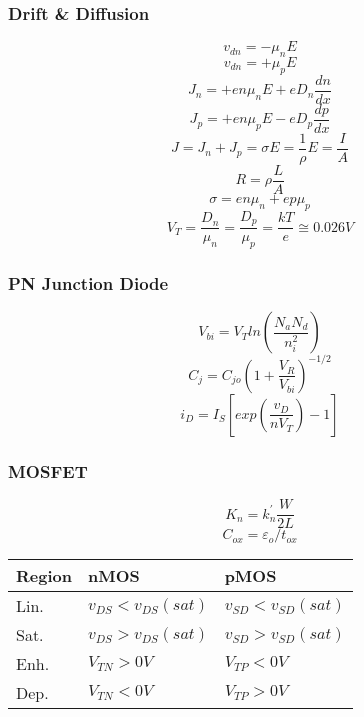 \documentclass[landscape, 12pt]{report}
\begin{document}
\begin{multicols*}{3}
\subsubsection*{Drift \& Diffusion}
\begin{equation}
    v_{dn} = -\mu_nE
\end{equation}
\begin{equation}
    v_{dn} = +\mu_pE
\end{equation}
\begin{equation}
    J_n = +en\mu_nE + eD_n\frac{dn}{dx}
\end{equation}
\begin{equation}
    J_p = +en\mu_pE -eD_p\frac{dp}{dx}
\end{equation}
\begin{equation}
    J = J_n + J_p = \sigma E = \frac{1}{\rho}E = \frac{I}{A}
\end{equation}
\begin{equation}
    R = \rho \frac{L}{A}
\end{equation}
\begin{equation}
    \sigma = en\mu_n + ep\mu_p
\end{equation}
\begin{equation}
    V_T = \frac{D_n}{\mu_n} = \frac{D_p}{\mu_p} = \frac{kT}{e} \cong 0.026V
\end{equation}
\subsubsection*{PN Junction Diode}
\begin{equation}
    V_{bi} = V_T ln (\frac{N_aN_d}{n_i^2})
\end{equation}
\begin{equation}
    C_j = C_{jo}(1+\frac{V_R}{V_{bi}})^{-1/2}
\end{equation}
\begin{equation}
    i_D = I_S [exp(\frac{v_D}{nV_T})-1]
\end{equation}
\subsubsection*{MOSFET}
\begin{equation}
    K_n = k^{'}_{n}\frac{W}{2L}
\end{equation}
\begin{equation}
    C_{ox} = \varepsilon_o/t_{ox}
\end{equation}
\begin{tabular}{p{1.5cm}|p{2.775cm}|p{2.775cm}}
Region & nMOS & pMOS \\
\hline
Lin. & $v_{DS} < v_{DS}(sat)$ & $v_{SD} < v_{SD}(sat)$ \\
Sat. & $v_{DS} > v_{DS}(sat)$ & $v_{SD} > v_{SD}(sat)$ \\
Enh. & $V_{TN} > 0V$ & $V_{TP} < 0V$ \\
Dep. & $V_{TN} < 0V$ & $V_{TP} > 0V$ \\
\end{tabular}

\end{multicols*}
\end{document}
